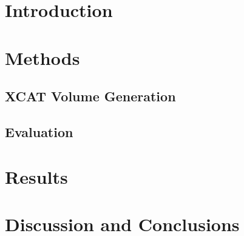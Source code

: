 \section{Introduction} \label{sec:introduction}


\section{Methods} \label{sec:methods}
    \subsection{XCAT Volume Generation} \label{sec:xcat_volume_generation}
        
        
    
    \subsection{Evaluation} \label{sec:evaluation}
        


\section{Results} \label{sec:results}
        
        
        
        
        
        
    
    


\section{Discussion and Conclusions} \label{sec:discussion_and_conclusions}
    
    